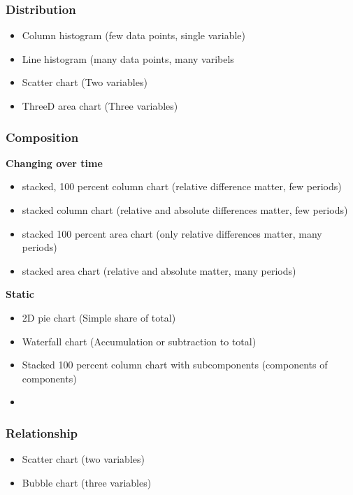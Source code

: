 \subsubsection{Distribution}
\begin{itemize}
\item Column histogram (few data points, single variable)
\item Line histogram (many data points, many varibels
\item Scatter chart (Two variables)
\item ThreeD area chart (Three variables)
\end{itemize}

\subsubsection{Composition}
\textbf{Changing over time} \\
\begin{itemize}
\item stacked, 100 percent column chart (relative difference matter, few periods)
\item stacked column chart (relative and absolute differences matter, few periods)
\item stacked 100 percent area chart (only relative differences matter, many periods)
\item stacked area chart (relative and absolute matter, many periods)
\end{itemize}

\textbf{Static} \\
\begin{itemize}
\item 2D pie chart (Simple share of total)
\item Waterfall chart (Accumulation or subtraction to total)
\item Stacked 100 percent column chart with subcomponents (components of components)
\item
\end{itemize}

\subsubsection{Relationship}
\begin{itemize}
\item Scatter chart (two variables)
\item Bubble chart (three variables)
\end{itemize}

